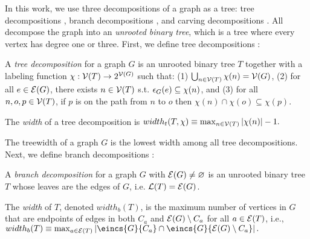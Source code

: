 In this work, we use three decompositions of a graph as a tree: tree decompositions \cite{RS91}, branch decompositions \cite{RS91}, and carving decompositions \cite{ST94}. All decompose the graph into an \emph{unrooted binary tree}, which is a tree where every vertex has degree one or three. First, we define tree decompositions \cite{RS91}:
\begin{definition} %
	A \emph{tree decomposition} for a graph $G$ is an unrooted binary tree $T$ together with a labeling function $\chi : \mathcal{V}(T) \rightarrow 2^{\mathcal{V}(G)}$ such that: 
	(1) $\bigcup_{n \in \mathcal{V}(T)} \chi(n) = \mathcal{V}(G)$,
	(2) for all $e \in \mathcal{E}(G)$, there exists $n \in \mathcal{V}(T)$ s.t. $\epsilon_{G}(e) \subseteq \chi(n)$, and 
	(3) for all $n, o, p \in \mathcal{V}(T)$, if $p$ is on the path from $n$ to $o$ then $\chi(n) \cap \chi(o) \subseteq \chi(p)$.
	
	
	The \emph{width} of a tree decomposition is $width_t(T, \chi) \equiv \max_{n \in \mathcal{V}(T)} | \chi(n) | - 1.$
\end{definition}
The treewidth of a graph $G$ is the lowest width among all tree decompositions. Next, we define branch decompositions \cite{RS91}:
\begin{definition}%
\label{def:branch}
	A \emph{branch decomposition} for a graph $G$ with $\mathcal{E}(G) \neq \varnothing$ is an unrooted binary tree $T$ whose leaves are the edges of $G$, i.e. $\mathcal{L}(T) = \mathcal{E}(G)$. 
	
    The \emph{width} of $T$, denoted $width_b(T)$, is the maximum number of vertices in $G$ that are endpoints of edges in both $C_a$ and $\mathcal{E}(G) \setminus C_a$ for all $a \in \mathcal{E}(T)$, i.e.,
	$width_b(T) \equiv \max_{a \in \E{T}} \left| \eincs{G}{C_a} \cap \eincs{G}{\E{G} \setminus C_a} \right|.$
\end{definition}

